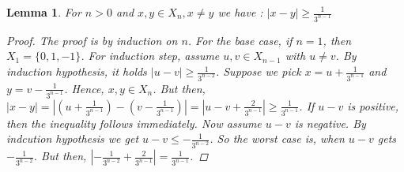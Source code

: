\documentclass[12pt, a4paper]{scrartcl}
\newtheorem{lemma}[definition]{Lemma}
\begin{document}
\begin{lemma}
    For $n>0$ and $x,y \in X_n, x \neq y$ we have : $\left| x - y \right| \geq \frac{1}{3^{n-1}}$

    \begin{proof}
        The proof is by induction on $n$. For the base case, if $n=1$, then $X_1 = \{0,1,-1\}$. For induction step, assume $u,v \in X_{n-1}$ with $u \neq v$. By induction hypothesis, it holds 
        $|u-v| \geq \frac{1}{3^{n-2}}$. Suppose we pick $x = u + \frac{1}{3^{n-1}}$ and $y = v - \frac{1}{3^{n-1}}$. Hence, $x,y \in X_n$. But then, $|x - y| = \left| (u + \frac{1}{3^{n-1}}) - (v - \frac{1}{3^{n-1}})\right| = \left| u - v + \frac{2}{3^{n-1}} \right| \geq \frac{1}{3^{n-1}}$. If $u-v$ is positive, 
        then the inequality follows immediately. Now assume $u-v$ is negative. By indcution hypothesis we get $u-v \leq -\frac{1}{3^{n-2}}$. So the worst case is, when $u-v$ gets $-\frac{1}{3^{n-2}}$.
        But then, $\left| -\frac{1}{3^{n-2}} + \frac{2}{3^{n-1}} \right| = \frac{1}{3^{n-1}}$.
    \end{proof}
\end{lemma}
\end{document}
